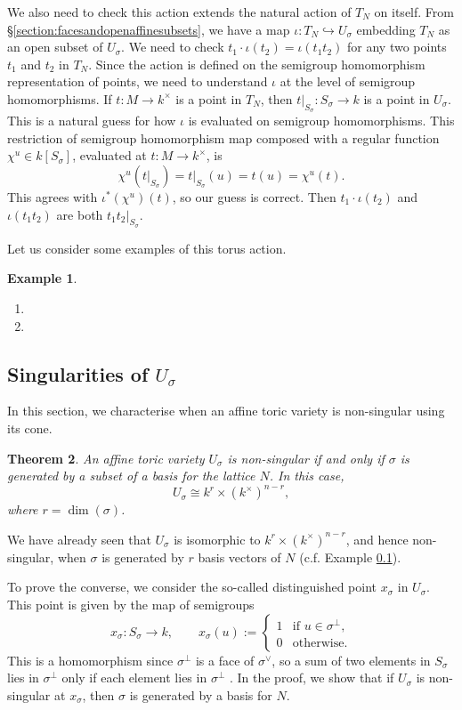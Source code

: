 \documentclass[12pt]{amsart}
\theoremstyle{plain}
\newtheorem{theorem}{Theorem}[subsection]
\newtheorem{example}[theorem]{Example}
\begin{document}
We also need to check this action extends the natural action of $T_N$ on itself.
From \S\ref{section:facesandopenaffinesubsets}, we have a map $\iota : T_N \hookrightarrow U_\sigma$ embedding $T_N$ as an open subset of $U_\sigma$.
We need to check $t_1 \cdot \iota(t_2) = \iota(t_1 t_2)$ for any two points $t_1$ and $t_2$ in $T_N$.
Since the action is defined on the semigroup homomorphism representation of points, we need to understand $\iota$ at the level of semigroup homomorphisms.
If $t : M \to k^\times$ is a point in $T_N$, then $\left. t \right|_{S_\sigma} : S_\sigma \to k$ is a point in $U_\sigma$.
This is a natural guess for how $\iota$ is evaluated on semigroup homomorphisms.
This restriction of semigroup homomorphism map composed with a regular function $\chi^u \in k[S_\sigma]$, evaluated at $t : M \to k^\times$, is
$$\chi^u(\left. t \right|_{S_\sigma}) = \left. t \right|_{S_\sigma}(u) = t(u) = \chi^u(t).$$
This agrees with $\iota^*(\chi^u)(t)$, so our guess is correct.
Then $t_1 \cdot \iota(t_2)$ and $\iota(t_1 t_2)$ are both $\left. t_1 t_2 \right|_{S_\sigma}$.

Let us consider some examples of this torus action.

\begin{example}
\begin{enumerate}
\item
\item
\end{enumerate}
\end{example}


\subsection{Singularities of $U_\sigma$}
In this section, we characterise when an affine toric variety is non-singular using its cone.

\begin{theorem}
An affine toric variety $U_\sigma$ is non-singular if and only if $\sigma$ is generated by a subset of a basis for the lattice $N$.
In this case,
$$U_\sigma \cong k^r \times (k^\times)^{n-r},$$
where $r = \dim(\sigma)$.
\end{theorem}

We have already seen that $U_\sigma$ is isomorphic to $k^r \times (k^\times)^{n-r}$, and hence non-singular, when $\sigma$ is generated by $r$ basis vectors of $N$ (c.f. Example \ref{}).

To prove the converse, we consider the so-called distinguished point $x_\sigma$ in $U_\sigma$.
This point is given by the map of semigroups
$$x_\sigma : S_\sigma \to k, \qquad x_\sigma(u) := \begin{cases} 1 & \text{if } u \in \sigma^\perp, \\ 0 & \text{otherwise.} \end{cases}$$
This is a homomorphism since $\sigma^\perp$ is a face of $\sigma^\vee$, so a sum of two elements in $S_\sigma$ lies in $\sigma^\perp$ only if each element lies in $\sigma^\perp$ \cite[\S 2.1]{Fulton93}.
In the proof, we show that if $U_\sigma$ is non-singular at $x_\sigma$, then $\sigma$ is generated by a basis for $N$.
\end{document}
